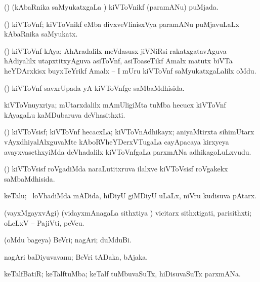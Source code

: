 \bentry
{}
\gl{\gu}
\bmng
(\ravi) (kAbaRnika saMyukatxgaLa \vi) kiVToVnikf (paramANu) puMjada. 
\emng
\eentry

\bentry
{}
\gl{\nA}
\bmng
(\ravi) kiVToVnf; kiVToVnikf eMba divxveVlinisxVya paramANu puMjavuLaLx kAbaRnika saMyukatx. 
\emng
\eentry

\bentry
{}
\gl{\nA}
\bmng
(\jiVra) kiVToVnf kAya; AhAradalilx meVdasusx jiVNiRsi rakatxgatavAguva hAdiyalilx utapxtitxyAguva asiToVnf, asiToaseTikf Amalx matutx biVTa heYDArxkisx buyxTeYrikf Amalx -- I mUru kiVToVnf saMyukatxgaLalilx oMdu. 
\emng
\eentry

\bentry
{}
\gl{\gu}
\bmng
(\ravi) kiVToVnf savxrUpada yA kiVToVnfge saMbaMdhisida. 
\emng
\eentry

\bentry
{}
\gl{\nA}
\bmng
kiVToVnuyxriya; mUtarxdalilx mAmUligiMta tuMba hecucx kiVToVnf kAyagaLu kaMDubaruva deVhasithxti. 
\emng
\eentry

\bentry
{}
\gl{\nA}
\bmng
(\veYshA) kiVToVsisf; kiVToVnf hecacxLa; kiVToVnAdhikayx; aniyaMtirxta sihimUtarx vAyxdhiyalAlxguvaMte kAboRVheYDerxVTugaLa cayApacaya kirxyeya avayxvasethxyiMda deVhadalilx kiVToVnfgaLa parxmANa adhikagoLuLxvudu. 
\emng
\eentry

\bentry
{}
\gl{\gu}
\bmng
(\veYshA) kiVToVsisf roVgadiMda naraLutitxruva ilalxve kiVToVsisf roVgakekx saMbaMdhisida. 
\emng
\eentry

\bentry
{}
\gl{\nA}
\bmng
keTalu; \sA\ loVhadiMda mADida, hiDiyU giMDiyU uLaLx, niVru kudisuva pAtarx. 
\emng

\noindent
\gl{\nuga}
\bmng
{} (vayxMgayxvAgi) (vidayxmAnagaLa sithxtiya \vi) vicitarx sithxtigati, parisithxti; oLeLxV -- PajiVti, peVcu. 
\emng
\eentry

\bentry
{}
\gl{\nA}
\bmng
(oMdu bageya) BeVri; nagAri; duMduBi.   
\emng
\eentry

\bentry
{}
\gl{\nA}
\bmng
nagAri baDiyuvavanu; BeVri tADaka, bAjaka. 
\emng
\eentry

\bentry
{}
\gl{\nA}
\bmng
keTalfBatiR; keTalftuMba; keTalf tuMbuvaSuTx, hiDisuvaSuTx parxmANa. 
\emng
\eentry

